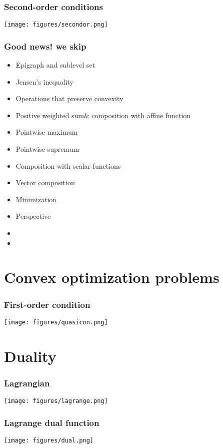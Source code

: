 \documentclass[10pt,mathserif]{beamer}
\begin{document}
\begin{frame}\frametitle{Second-order conditions}
\begin{center}
\texttt{[image: figures/secondor.png]}
\end{center}
\end{frame}
\begin{frame}\frametitle{Good news!  we skip}

\begin{block}{}
\begin{itemize}
\item Epigraph and sublevel set
\item Jensen’s inequality
\item Operations that preserve convexity
\item Positive weighted sum$\&$ composition with affine function
\item Pointwise maximum
\item Pointwise supremum
\item Composition with scalar functions
\item Vector composition
\item Minimization
\item Perspective
\item {}
\item {}
\end{itemize}
\end{block}
\end{frame}

\section{Convex optimization problems}
\begin{frame}\frametitle{First-order condition}
\begin{center}
\texttt{[image: figures/quasicon.png]}
\end{center}
\end{frame}
\section{Duality}
\begin{frame}\frametitle{Lagrangian}
\begin{center}
\texttt{[image: figures/lagrange.png]}
\end{center}
\end{frame}
\begin{frame}\frametitle{Lagrange dual function}
\begin{center}
\texttt{[image: figures/dual.png]}
\end{center}
\end{frame}
\end{document}
